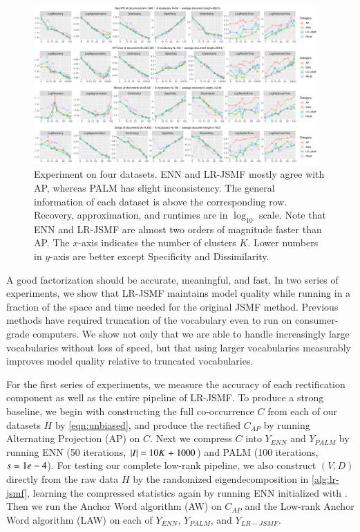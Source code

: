 \begin{figure}[ht]
 	\centering
	\includegraphics[width=0.97\textwidth, trim={1.0cm 1.0cm 1.0cm 0.0cm}]
	{./lrtm/pics/real_MethodsPerTopics_new-plain.pdf}
	\caption{Experiment on four datasets. ENN and LR\hyp{}JSMF mostly agree with
	AP, whereas PALM has slight inconsistency. The general information of each
	dataset is above the corresponding row. Recovery, approximation, and runtimes
	are in $\log_{10}$ scale. Note that ENN and LR\hyp{}JSMF are almost two orders
	of magnitude faster than AP. The $x$\hyp{}axis indicates the number of
	clusters $K$. Lower numbers in $y$\hyp{}axis are better except Specificity and
	Dissimilarity.} 
	\label{fig:results-topics}
\end{figure}

A good factorization should be accurate, meaningful, and fast. In two series of
experiments, we show that LR\hyp{}JSMF maintains model quality while running in
a fraction of the space and time needed for the original JSMF method. Previous
methods have required truncation of the vocabulary even to run on
consumer\hyp{}grade computers. We show not only that we are able to handle
increasingly large vocabularies without loss of speed, but that using larger
vocabularies measurably improves model quality relative to truncated
vocabularies.

For the first series of experiments, we measure the accuracy of each
rectification component as well as the entire pipeline of LR\hyp{}JSMF. To
produce a strong baseline, we begin with constructing the full 
co\hyp{}occurrence $C$ from each of our datasets $H$ by \cref{eqn:unbiased},
and produce the rectified $C_{AP}$ by running Alternating Projection (AP) on
$C$. Next we compress $C$ into $Y_{ENN}$ and $Y_{PALM}$ by running ENN (50
iterations, $\left\lvert I\right\rvert\mathrel{=} 10K \mathrel{+} 1000$) and PALM (100 iterations, $s\mathrel{=}1e-4$).
For testing our complete low\hyp{}rank pipeline, we also construct $(V, D)$
directly from the raw data $H$ by the randomized eigendecomposition in 
\cref{alg:lr-jsmf}, learning the compressed statistics 
again by running ENN initialized with . Then we run the
Anchor Word algorithm (AW) on $C_{AP}$ and the Low\hyp{}rank Anchor Word
algorithm (LAW) on each of $Y_{ENN}$, $Y_{PALM}$, and $Y_{LR-JSMF}$.

